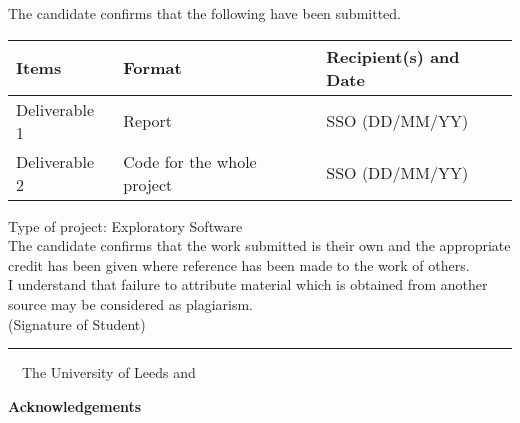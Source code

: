 \frontcover

\clearpage
\noindent The candidate confirms that the following have been submitted.\\
\begin{table}[ht!]
\begin{tabular}{|p{}|p{}|p{}|}
\hline 
Items & Format & Recipient(s) and Date \\ 
\hline 
Deliverable 1 & Report & SSO (DD/MM/YY) \\ 
\hline 
Deliverable 2 & Code for the whole project & SSO (DD/MM/YY) \\ 
\hline 
\end{tabular} 
\end{table}

\noindent Type of project: Exploratory Software
\vspace{\fill}\\
\noindent The candidate confirms that the work submitted is their own and the appropriate credit has been given where reference has been made to the work of others.
\vspace{\fill}\\
\noindent I understand that failure to attribute material which is obtained from another source may be considered as plagiarism.
\vspace{\fill}\\
\flushright(Signature of Student) \rule{50mm}{1pt}
\flushleft
\vspace{\fill}
\textcopyright~\session~The University of Leeds and~\fullname

\begin{dissertationsummary}

\end{dissertationsummary}

\clearpage
\centering\textbf{Acknowledgements}
\flushleft


\tableofcontents


